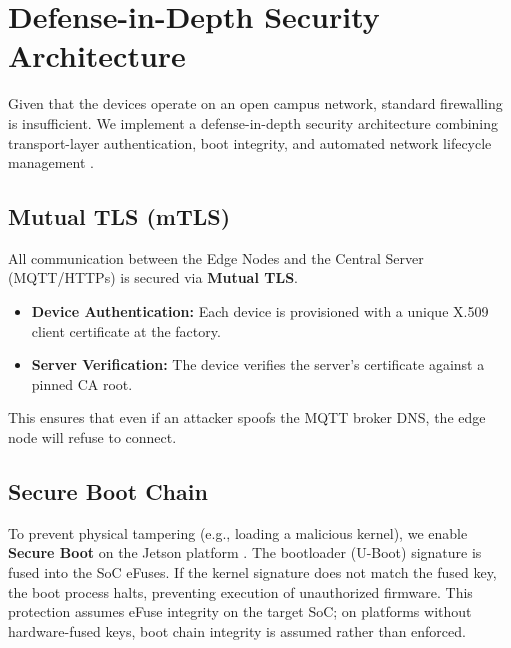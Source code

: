 \documentclass[conference]{IEEEtran}
\begin{document}
\section{Defense-in-Depth Security Architecture}
Given that the devices operate on an open campus network, standard firewalling is insufficient. We implement a defense-in-depth security architecture combining transport-layer authentication, boot integrity, and automated network lifecycle management \cite{b30}.

\subsection{Mutual TLS (mTLS)}
All communication between the Edge Nodes and the Central Server (MQTT/HTTPs) is secured via \textbf{Mutual TLS}. 
\begin{itemize}
    \item \textbf{Device Authentication:} Each device is provisioned with a unique X.509 client certificate at the factory.
    \item \textbf{Server Verification:} The device verifies the server's certificate against a pinned CA root.
\end{itemize}
This ensures that even if an attacker spoofs the MQTT broker DNS, the edge node will refuse to connect.

\subsection{Secure Boot Chain}
To prevent physical tampering (e.g., loading a malicious kernel), we enable \textbf{Secure Boot} on the Jetson platform \cite{b31}. The bootloader (U-Boot) signature is fused into the SoC eFuses. If the kernel signature does not match the fused key, the boot process halts, preventing execution of unauthorized firmware. This protection assumes eFuse integrity on the target SoC; on platforms without hardware-fused keys, boot chain integrity is assumed rather than enforced.
\end{document}
